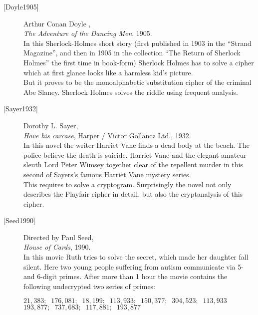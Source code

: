 \begin{description}

\item[\textrm{[Doyle1905]}] 
    Arthur Conan Doyle , \\
    {\em The Adventure of the Dancing Men}, 1905. \\
    In this Sherlock-Holmes short story (first published in 1903 in the
    ``Strand Magazine'', and then in 1905 in the collection 
    ``The Return of Sherlock Holmes'' the first time in book-form)
    Sherlock Holmes has to solve a cipher which at first glance looks
    like a harmless kid's picture. \\
    But it proves to be the
    monoalphabetic substitution cipher of the criminal Abe Slaney.
    Sherlock Holmes solves the riddle using frequent analysis.


\item[\textrm{[Sayer1932]}] 
    Dorothy L. Sayer, \\
    {\em Have his carcase}, Harper / Victor Gollancz Ltd., 1932. \\
    In this novel the writer Harriet Vane finds a dead body at the beach.
    The police believe the death is suicide.
    Harriet Vane and the elegant amateur sleuth Lord Peter Wimsey together
    clear of the repellent murder in this second of Sayers's famous
    Harriet Vane mystery series. \\
    This requires to solve a cryptogram. Surprisingly the novel not only
    describes the Playfair cipher in detail, but also the cryptanalysis
    of this cipher. 


\item[\textrm{[Seed1990]}] 
    Directed by Paul Seed, \\
    {\em House of Cards}, 1990. \\
    In this movie Ruth tries to solve the secret, which made her daughter
    fall silent. Here two young people suffering from autism communicate
    via 5- and 6-digit primes.
    After more than 1 hour the movie contains the following undecrypted
    two series of primes:
    \begin{center}
    $21,383; \;\;176,081; \;\;18,199; \;\;113,933; \;\;150,377; \;\;304,523; \;\;113,933$ \\
    $193,877; \;\;737,683; \;\;117,881; \;\;193,877$
    \end{center}



\end{description}
